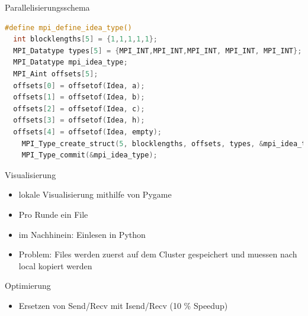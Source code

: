 \begin{frame}[fragile]{Parallelisierungsschema}
\begin{lstlisting}[language=C,basicstyle=\small,breaklines=true,keywordstyle=\color{black}]
#define mpi_define_idea_type()                                               
  int blocklengths[5] = {1,1,1,1,1};                                  
  MPI_Datatype types[5] = {MPI_INT,MPI_INT,MPI_INT, MPI_INT, MPI_INT};       
  MPI_Datatype mpi_idea_type;                                                
  MPI_Aint offsets[5];                                                   
  offsets[0] = offsetof(Idea, a);                                            
  offsets[1] = offsetof(Idea, b);                                            
  offsets[2] = offsetof(Idea, c);                                            
  offsets[3] = offsetof(Idea, h);                                            
  offsets[4] = offsetof(Idea, empty);                                        
    MPI_Type_create_struct(5, blocklengths, offsets, types, &mpi_idea_type); 
    MPI_Type_commit(&mpi_idea_type);                                         
\end{lstlisting}
\end{frame}

\begin{frame}[fragile]{Visualisierung}
	\begin{itemize}
		\item lokale Visualisierung mithilfe von Pygame
		\item Pro Runde ein File
		\item im Nachhinein: Einlesen in Python
		\item Problem: Files werden zuerst auf dem Cluster gespeichert und muessen nach local kopiert werden
	\end{itemize}
\end{frame}

\begin{frame}{Optimierung}
	\begin{itemize}
		\item Ersetzen von Send/Recv mit Isend/Recv (10 \% Speedup)
	\end{itemize}
\end{frame}

